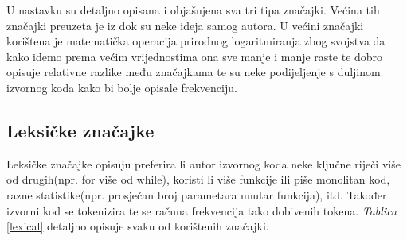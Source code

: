	U nastavku su detaljno opisana i objašnjena sva tri tipa značajki. Većina tih značajki preuzeta je iz \cite{islam} dok su neke ideja samog autora. U većini značajki korištena je matematička operacija prirodnog logaritmiranja zbog svojstva da kako idemo prema većim vrijednostima ona sve manje i manje raste te dobro opisuje relativne razlike među značajkama te su neke podijeljenje s duljinom izvornog koda kako bi bolje opisale frekvenciju. 

\subsection{Leksičke značajke}
Leksičke značajke opisuju preferira li autor izvornog koda neke ključne riječi više od drugih(npr. for više od while), koristi li više funkcije ili piše monolitan kod, razne statistike(npr. prosječan broj parametara unutar funkcija), itd. Također izvorni kod se tokenizira te se računa frekvencija tako dobivenih tokena. \textit{Tablica} \ref{lexical} detaljno opisuje svaku od korištenih značajki. 

